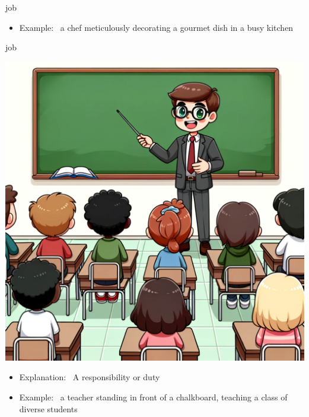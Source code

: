 \documentclass[avery5371, grid,frame]{flashcards}
\begin{document}
\begin{flashcard}{job}
\begin{center}
\begin{minipage}[c]{.45\textwidth}
\begin{itemize}
            \item Example: \ a chef meticulously decorating a gourmet dish in a busy kitchen
            \end{itemize}
        \end{minipage}
    \end{center}
    \vspace*{\fill}
\end{flashcard}\begin{flashcard}{job}
    \vspace*{\fill}
    \begin{center}
        \begin{minipage}[c]{.45\textwidth}
            \includegraphics[width=\textwidth]{cards/j/job/job - a teacher standing in front of a chalkboard, teaching a class of diverse students.png}
        \end{minipage}
        \begin{minipage}[c]{.45\textwidth}
            \begin{itemize}\setlength\itemsep{12pt}
            \item Explanation: \ A responsibility or duty

            \item Example: \ a teacher standing in front of a chalkboard, teaching a class of diverse students
            \end{itemize}
        \end{minipage}
    \end{center}
    \vspace*{\fill}
\end{flashcard}
\end{document}
